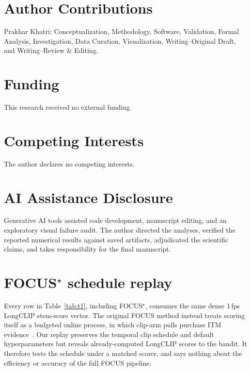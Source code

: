\documentclass[11pt]{article}
\begin{document}
\section{Author Contributions}

Prakhar Khatri: Conceptualization, Methodology, Software, Validation, Formal Analysis, Investigation, Data Curation, Visualization, Writing--Original Draft, and Writing--Review \& Editing.

\section{Funding}

This research received no external funding.

\section{Competing Interests}

The author declares no competing interests.

\section{AI Assistance Disclosure}

Generative AI tools assisted code development, manuscript editing, and an exploratory visual failure audit.
The author directed the analyses, verified the reported numerical results against saved artifacts, adjudicated the scientific claims, and takes responsibility for the final manuscript.



\appendix

\section{FOCUS$^\star$ schedule replay}
\label{app:focus}

Every row in Table~\ref{tab:t1}, including FOCUS$^\star$, consumes the same dense 1\,fps LongCLIP stem-score vector.
The original FOCUS method instead treats scoring itself as a budgeted online process, in which clip-arm pulls purchase ITM evidence~\citep{zhu2025focus}.
Our replay preserves the temporal clip schedule and default hyperparameters but reveals already-computed LongCLIP scores to the bandit.
It therefore tests the schedule under a matched scorer, and says nothing about the efficiency or accuracy of the full FOCUS pipeline.
\end{document}
